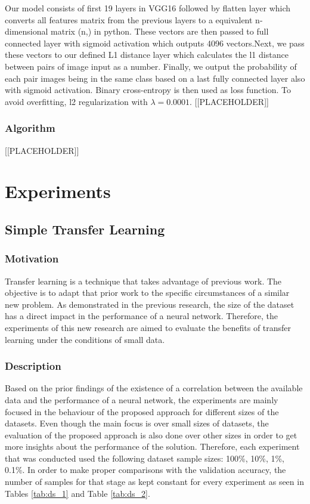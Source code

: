 \documentclass{article}
\begin{document}
Our model consists of first 19 layers in VGG16 followed by flatten layer which converts all features matrix from the previous layers to a equivalent n-dimensional matrix (n,) in python. These vectors are then passed to full connected layer with sigmoid activation which outputs 4096 vectors.Next, we pass these vectors to our defined L1 distance layer which calculates the l1 distance between pairs of image input as a number. Finally, we output the probability of each pair images being in the same class based on a last fully connected layer also with sigmoid activation. Binary cross-entropy is then used as loss function. To avoid overfitting, l2 regularization with $\lambda=0.0001$. 
[[PLACEHOLDER]]

\subsubsection{\textbf{Algorithm}}

[[PLACEHOLDER]]

\section{Experiments}
\label{sec:experiments}

\subsection{Simple Transfer Learning}

\subsubsection{\textbf{Motivation}}

Transfer learning is a technique that takes advantage of previous work. The objective is to adapt that prior work to the specific circumstances of a similar new problem. As demonstrated in the previous research, the size of the dataset has a direct impact in the performance of a neural network. Therefore, the experiments of this new research are aimed to evaluate the benefits of transfer learning under the conditions of small data.

\subsubsection{\textbf{Description}}

Based on the prior findings of the existence of a correlation between the available data and the performance of a neural network, the experiments are mainly focused in the behaviour of the proposed approach for different sizes of the datasets. Even though the main focus is over small sizes of datasets, the evaluation of the proposed approach is also done over other sizes in order to get more insights about the performance of the solution. Therefore, each experiment that was conducted used the following dataset sample sizes: 100\%, 10\%, 1\%, 0.1\%. In order to make proper comparisons with the validation accuracy, the number of samples for that stage as kept constant for every experiment as seen in Tables \ref{tab:ds_1} and Table \ref{tab:ds_2}.
\end{document}
